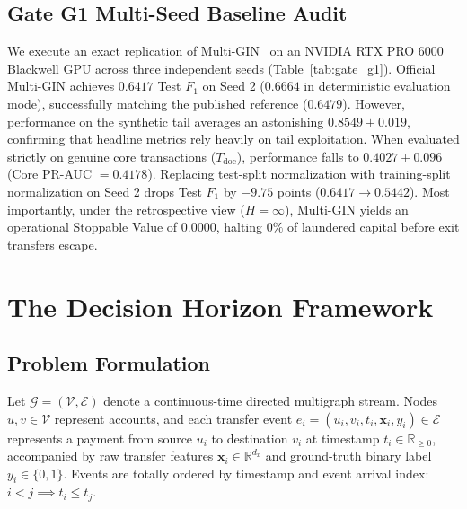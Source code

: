 \documentclass[sigconf,nonacm]{acmart}
\begin{document}
\subsection{Gate G1 Multi-Seed Baseline Audit}
We execute an exact replication of Multi-GIN~\cite{egressy2024multigraph} on an NVIDIA RTX PRO 6000 Blackwell GPU across three independent seeds (Table~\ref{tab:gate_g1}). Official Multi-GIN achieves $0.6417$ Test $F_1$ on Seed 2 ($0.6664$ in deterministic evaluation mode), successfully matching the published reference ($0.6479$). However, performance on the synthetic tail averages an astonishing $0.8549 \pm 0.019$, confirming that headline metrics rely heavily on tail exploitation. When evaluated strictly on genuine core transactions ($T_{\text{doc}}$), performance falls to $0.4027 \pm 0.096$ (Core PR-AUC $= 0.4178$). Replacing test-split normalization with training-split normalization on Seed 2 drops Test $F_1$ by $-9.75$ points ($0.6417 \to 0.5442$). Most importantly, under the retrospective view ($H = \infty$), Multi-GIN yields an operational Stoppable Value of \textbf{$0.0000$}, halting $0\%$ of laundered capital before exit transfers escape.

\section{The Decision Horizon Framework}
\label{sec:methodology}

\subsection{Problem Formulation}
Let $\mathcal{G} = (\mathcal{V}, \mathcal{E})$ denote a continuous-time directed multigraph stream. Nodes $u, v \in \mathcal{V}$ represent accounts, and each transfer event $e_i = (u_i, v_i, t_i, \mathbf{x}_i, y_i) \in \mathcal{E}$ represents a payment from source $u_i$ to destination $v_i$ at timestamp $t_i \in \mathbb{R}_{\ge 0}$, accompanied by raw transfer features $\mathbf{x}_i \in \mathbb{R}^{d_x}$ and ground-truth binary label $y_i \in \{0, 1\}$. Events are totally ordered by timestamp and event arrival index: $i < j \implies t_i \le t_j$.
\end{document}
